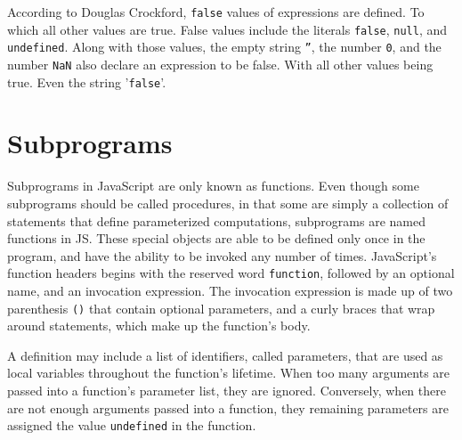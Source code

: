 \documentclass[man]{apa}
\begin{document}
According to Douglas Crockford, \texttt{false} values of expressions are defined. To which all other values are true. False values include the literals \texttt{false}, \texttt{null}, and \texttt{undefined}. Along with those values, the empty string \texttt{''}, the number \texttt{0}, and the number \texttt{NaN} also declare an expression to be false. With all other values being true. Even the string '\texttt{false}'.

\section{Subprograms}


Subprograms in JavaScript are only known as functions. Even though some subprograms should be called procedures, in that some are simply a collection of statements that define parameterized computations, subprograms are named functions in JS. These special objects are able to be defined only once in the program, and have the ability to be invoked any number of times. JavaScript's function headers begins with the reserved word \texttt{function}, followed by an optional name, and an invocation expression. The invocation expression is made up of two parenthesis \texttt{()} that contain optional parameters, and a curly braces \texttt{{}} that wrap around statements, which make up the function's body.

A definition may include a list of identifiers, called parameters, that are used as local variables throughout the function's lifetime. When too many arguments are passed into a function's parameter list, they are ignored. Conversely, when there are not enough arguments passed into a function, they remaining parameters are assigned the value \texttt{undefined} in the function.
\end{document}
